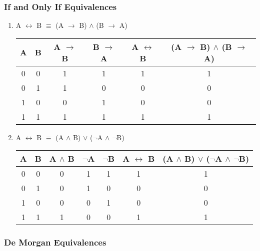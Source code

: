 \documentclass[12pt]{article}
\begin{document}
\subsubsection{If and Only If Equivalences}
\begin{enumerate}

  \item A $\leftrightarrow$ B $\equiv$ (A $\to$ B) $\land$ (B $\to$ A)

\begin{center}
  \begin{tabular} {| c | c | c | c | c | c |}
    \hline
    A & B & A $\to$ B & B $\to$ A & A $\leftrightarrow$ B & (A $\to$ B) $\land$ (B $\to$ A) \\ \hline
    0 & 0 & 1 & 1 & 1 & 1 \\
    0 & 1 & 1 & 0 & 0 & 0 \\
    1 & 0 & 0 & 1 & 0 & 0 \\
    1 & 1 & 1 & 1 & 1 & 1 \\ \hline
  \end{tabular} 
\end{center}

  \item A $\leftrightarrow$ B $\equiv$ (A $\land$ B) $\lor$ ($\neg$A $\land$ $\neg$B)

\begin{center}
  \begin{tabular} {| c | c | c | c | c | c | c |}
    \hline
    A & B & A $\land$ B & $\neg$A & $\neg$B & A $\leftrightarrow$ B & (A $\land$ B) $\lor$ ($\neg$A $\land$ $\neg$B) \\ \hline
    0 & 0 & 0 & 1 & 1 & 1 & 1 \\
    0 & 1 & 0 & 1 & 0 & 0 & 0 \\
    1 & 0 & 0 & 0 & 1 & 0 & 0 \\
    1 & 1 & 1 & 0 & 0 & 1 & 1 \\ \hline
  \end{tabular} 
\end{center}
\end{enumerate}

\subsubsection{De Morgan Equivalences}
\end{document}
